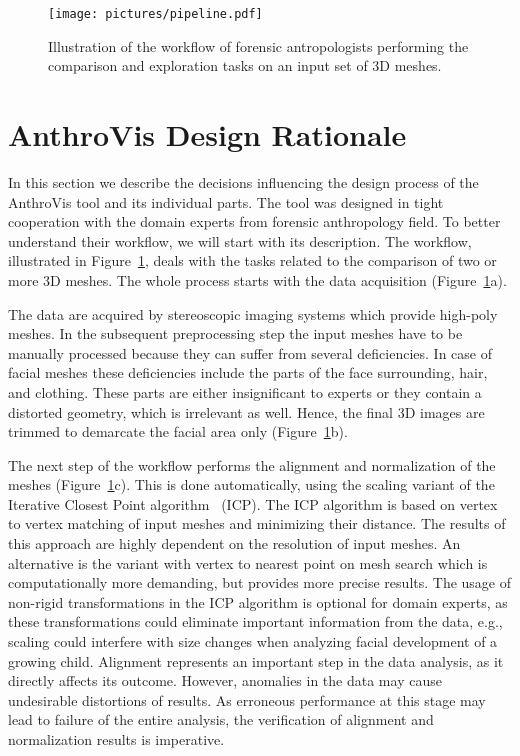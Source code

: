 \documentclass[final,5p,times]{elsarticle}
\begin{document}
\begin{figure}[tbh]
	\centering
  \texttt{[image: pictures/pipeline.pdf]}
  \caption{\label{fig:pipeline} Illustration of the workflow of forensic antropologists performing the comparison and exploration tasks on an input set of 3D meshes.}
	\vspace{-2mm}
\end{figure}

\section{AnthroVis Design Rationale} \label{overview}
In this section we describe the decisions influencing the design process of the AnthroVis tool and its individual parts.
The tool was designed in tight cooperation with the domain experts from forensic anthropology field.
To better understand their workflow, we will start with its description.
The workflow, illustrated in Figure~\ref{fig:pipeline}, deals with the tasks related to the comparison of two or more 3D meshes.
The whole process starts with the data acquisition (Figure~\ref{fig:pipeline}a).

\begin{sloppypar}
The data are acquired by stereoscopic imaging systems which provide high-poly meshes. 
In the subsequent preprocessing step the input meshes have to be manually processed because they can suffer from several deficiencies. 
In case of facial meshes these deficiencies include the parts of the face surrounding, hair, and clothing.
These parts are either insignificant to experts or they contain a distorted geometry, which is irrelevant as well. 
Hence, the final 3D images are trimmed to demarcate the facial area only (Figure~\ref{fig:pipeline}b).
\end{sloppypar}

The next step of the workflow performs the alignment and normalization of the meshes (Figure~\ref{fig:pipeline}c). 
This is done automatically, using the scaling variant of the  Iterative Closest Point algorithm~\cite{besl1992method, du2010scaling} (ICP). 
The ICP algorithm is based on vertex to vertex matching of input meshes and  minimizing their distance.
The results of this approach are highly dependent on the resolution of input meshes.
An alternative is the variant with vertex to nearest point on mesh search which is computationally more demanding, but provides more precise results.
The usage of non-rigid transformations in the ICP algorithm is optional for domain experts, as these transformations could eliminate important information from the data, e.g., scaling could interfere with size changes when analyzing facial development of a growing child.
Alignment represents an important step in the data analysis, as it directly affects its outcome.
However, anomalies in the data may cause undesirable distortions of results. 
As erroneous performance at this stage may lead to failure of the entire analysis, the verification of alignment and normalization results is imperative.
\end{document}
